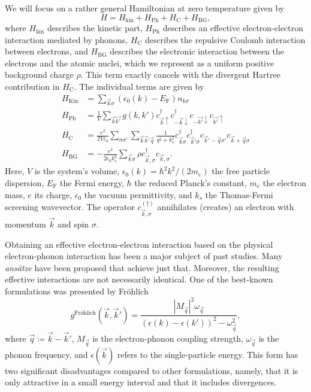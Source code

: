 \documentclass[
    reprint, 
    aps,
    preprintnumbers,
    twocolumn,
    prb,
    superscriptaddress
]{revtex4-2}
\newcommand{\up}{\uparrow}
\newcommand{\down}{\downarrow}
\newcommand{\Ef}{E_\mathrm{F}}
\newcommand{\ope}[2]{c_{\vec{#1} #2}}
\newcommand{\opd}[2]{\ope{#1}{#2}^\dagger}
\newcommand{\opSC}[1]{c_{-\vec{#1} \down} c_{\vec{#1} \up}}
\newcommand{\opSCd}[1]{c_{\vec{#1} \up}^\dagger c_{-\vec{#1} \down}^\dagger}
\newcommand{\bs}{\begin{subequations}}
\newcommand{\es}{\end{subequations}}
\begin{document}
We will focus on a rather general Hamiltonian at zero temperature given by
\begin{equation}
\label{eqn:base_hamiltonian}
  H = H_\mathrm{kin} + H_\mathrm{Ph} + H_\mathrm{C} + H_\mathrm{BG},
\end{equation}
where $H_\mathrm{kin}$ describes the kinetic part,
$H_\mathrm{Ph}$ describes an effective electron-electron interaction mediated by phonons, 
$H_\mathrm{C}$ describes the repulsive Coulomb interaction between electrons,
and $H_\mathrm{BG}$ describes the electronic interaction between the electrons and the atomic nuclei,
which we represent as a uniform positive background charge $\rho$.
This term exactly cancels with the divergent Hartree contribution in $H_\mathrm{C}$.
The individual terms are given by
\bs
\begin{align}
  H_\mathrm{Kin} &= \sum_{\vec{k} \sigma} \left( \epsilon_0 (k) - \Ef \right) n_{k\sigma} \\
  H_\mathrm{Ph} &= \frac{1}{V} \sum_{\vec{k} \vec{k'}} g(k,k') \opSCd{k} \opSC{k'} \\
  H_\mathrm{C} &= \frac{e^2}{2V \epsilon_0} \sum_{\sigma \sigma'} \sum_{\vec{k} \vec{k}' \vec{q}} \frac{1}{q^2 + k_s^2} \opd{k}{\sigma} \opd{k}{'\sigma} c_{\vec{k}'-\vec{q} \sigma'} c_{\vec{k}+\vec{q} \sigma} \\
  H_\mathrm{BG} &= - \frac{e^2}{2 \epsilon_0 k_s^2} \sum_{ \vec{k} \sigma } \rho c_{ \vec{k}, \sigma }^\dagger c_{ \vec{k}, \sigma }.
\end{align}
\es
Here, $V$ is the system's volume, $\epsilon_0 (k) = \hbar^2 k^2 / (2 m_e)$ the free particle dispersion, 
$\Ef$ the Fermi energy, $\hbar$ the reduced Planck's constant, $m_e$ the electron mass, 
$e$ its charge, $\epsilon_0$ the vacuum permittivity, and $k_s$ the Thomas-Fermi screening wavevector.
The operator $c_{ \vec{k}, \sigma }^{(\dagger)}$ annihilates (creates) an electron with momentum $\vec{k}$ and spin $\sigma$.

Obtaining an effective electron-electron interaction based on the physical electron-phonon interaction has been a major subject of past studies.
Many \textsl{ans\"atze} have been proposed that achieve just that.
Moreover, the resulting effective interactions are not necessarily identical.
One of the best-known formulations was presented by Fr\"ohlich \cite{frohlich1997}
\begin{equation}
  g^\text{Fr\"ohlich} (\vec{k},\vec{k}') = \frac{|M_{\vec{q}}|^2 \omega_{\vec{q}}}{(\epsilon(k) - \epsilon(k'))^2 - \omega_{\vec{q}}^2},
\end{equation}
where $\vec{q} \coloneqq \vec{k} - \vec{k}'$, $M_{\vec{q}}$ is the electron-phonon coupling strength,
$\omega_{\vec{q}}$ is the phonon frequency, and $\epsilon(\vec{k})$ refers to the single-particle energy.
This form has two significant disadvantages compared to other formulations, namely, that it is only attractive in a small energy interval and that it includes divergences.
\end{document}
